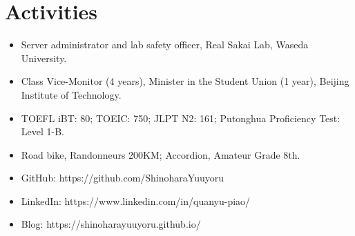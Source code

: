 \documentclass{resume}
\begin{document}
\section{Activities}
\begin{itemize}
  \item Server administrator and lab safety officer, Real Sakai Lab, Waseda University.
  \item Class Vice-Monitor (4 years), Minister in the Student Union (1 year), Beijing Institute of Technology.
  \item TOEFL iBT: 80; TOEIC: 750; JLPT N2: 161; Putonghua Proficiency Test: Level 1-B.
  \item Road bike, Randonneurs 200KM; Accordion, Amateur Grade 8th.
  \item GitHub: https://github.com/ShinoharaYuuyoru
  \item LinkedIn: https://www.linkedin.com/in/quanyu-piao/
  \item Blog: https://shinoharayuuyoru.github.io/
\end{itemize}

%
%
\end{document}
